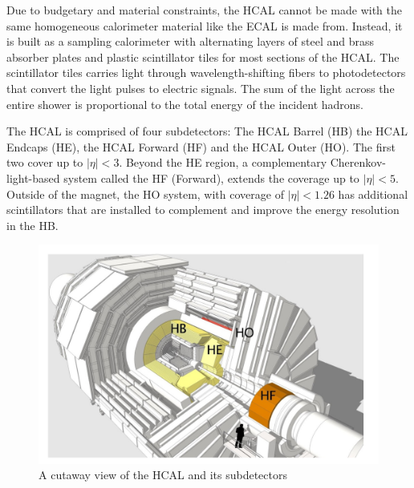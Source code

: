 Due to budgetary and material constraints, the HCAL cannot be made with the same homogeneous calorimeter material like the ECAL is made from. Instead, it is built as a sampling calorimeter with alternating layers of steel and brass absorber plates and plastic scintillator tiles for most sections of the HCAL. The scintillator tiles carries light through wavelength-shifting fibers to photodetectors that convert the light pulses to electric signals. The sum of the light across the entire shower is proportional to the total energy of the incident hadrons. 

The HCAL is comprised of four subdetectors: The HCAL Barrel (HB) the HCAL Endcaps (HE), the HCAL Forward (HF) and the HCAL Outer (HO). The first two cover up to $|\eta| < 3$. Beyond the HE region, a complementary Cherenkov-light-based system called the HF (Forward), extends the coverage up to $|\eta| <5$. Outside of the magnet, the HO system, with coverage of $|\eta| < 1.26$ has additional scintillators that are installed to complement and improve the energy resolution in the HB. 

\begin{figure}[htbp!]
\caption{A cutaway view of the HCAL and its subdetectors~\cite{Chatrchyan:2008aa}}
\begin{center}
\includegraphics[scale=0.6]{fig/LabelledHCAL.png}
\end{center}
\label{fig:HCAL}
\end{figure}



